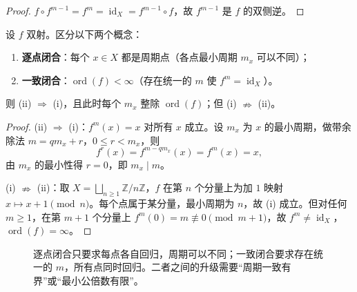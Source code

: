 \begin{proof}
$f\circ f^{m-1}=f^m=\operatorname{id}_X=f^{m-1}\circ f$，故 $f^{m-1}$ 是 $f$ 的双侧逆。
\end{proof}

\begin{lemma}[逐点闭合与一致闭合]\label{lem:pointwise_vs_uniform}
设 $f$ 双射。区分以下两个概念：
\begin{enumerate}[label=(\roman*)]
    \item \textbf{逐点闭合}：每个 $x\in X$ 都是周期点（各点最小周期 $m_x$ 可以不同）；
    \item \textbf{一致闭合}：$\operatorname{ord}(f)<\infty$（存在统一的 $m$ 使 $f^m=\operatorname{id}_X$）。
\end{enumerate}
则 (ii) $\Rightarrow$ (i)，且此时每个 $m_x$ 整除 $\operatorname{ord}(f)$；但 (i) $\nRightarrow$ (ii)。
\end{lemma}

\begin{proof}
(ii) $\Rightarrow$ (i)：$f^m(x)=x$ 对所有 $x$ 成立。设 $m_x$ 为 $x$ 的最小周期，做带余除法 $m=qm_x+r$，$0\le r<m_x$，则
\[
f^r(x)=f^{m-qm_x}(x)=f^m(x)=x,
\]
由 $m_x$ 的最小性得 $r=0$，即 $m_x\mid m$。

(i) $\nRightarrow$ (ii)：取 $X=\bigsqcup_{n\ge 1}\mathbb{Z}/n\mathbb{Z}$，$f$ 在第 $n$ 个分量上为加 $1$ 映射 $x\mapsto x+1\pmod n$。每个点属于某分量，最小周期为 $n$，故 (i) 成立。但对任何 $m\ge 1$，在第 $m+1$ 个分量上 $f^m(0)=m\not\equiv 0\pmod{m+1}$，故 $f^m\neq\operatorname{id}_X$，$\operatorname{ord}(f)=\infty$。
\end{proof}

\begin{figure}[htbp]
\centering
{}
\caption{逐点闭合只要求每点各自回归，周期可以不同；一致闭合要求存在统一的 $m$，所有点同时回归。二者之间的升级需要“周期一致有界”或“最小公倍数有限”。}
\label{fig:pointwise_vs_uniform}
\end{figure}

